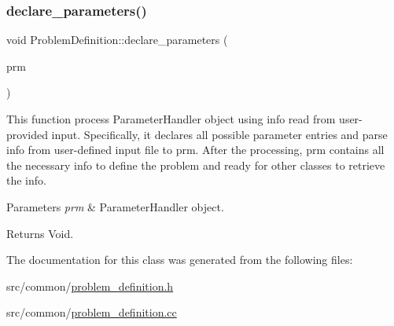 \subsubsection{\texorpdfstring{declare\+\_\+parameters()}{declare\_parameters()}}
{\footnotesize\ttfamily void Problem\+Definition\+::declare\+\_\+parameters (\begin{DoxyParamCaption}\item[{Parameter\+Handler \&}]{prm }\end{DoxyParamCaption})\hspace{0.3cm}{\ttfamily [static]}}

This function process Parameter\+Handler object using info read from user-\/provided input. Specifically, it declares all possible parameter entries and parse info from user-\/defined input file to prm. After the processing, prm contains all the necessary info to define the problem and ready for other classes to retrieve the info.


\begin{DoxyParams}{Parameters}
{\em prm} & Parameter\+Handler object. \\
\hline
\end{DoxyParams}
\begin{DoxyReturn}{Returns}
Void. 
\end{DoxyReturn}


The documentation for this class was generated from the following files\+:\begin{DoxyCompactItemize}
\item 
src/common/\hyperlink{problem__definition_8h}{problem\+\_\+definition.\+h}\item 
src/common/\hyperlink{problem__definition_8cc}{problem\+\_\+definition.\+cc}\end{DoxyCompactItemize}
